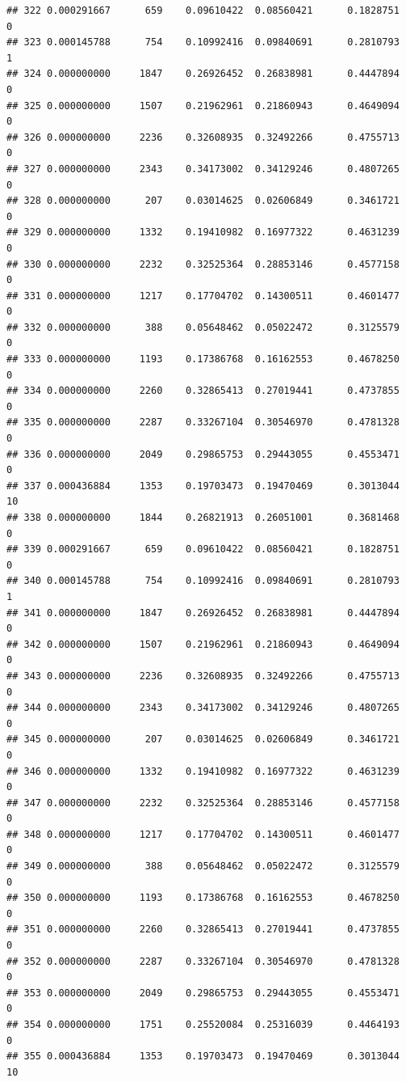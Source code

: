 \documentclass[
]{article}
\begin{document}
\begin{verbatim}
## 322 0.000291667      659    0.09610422  0.08560421      0.1828751       0
## 323 0.000145788      754    0.10992416  0.09840691      0.2810793       1
## 324 0.000000000     1847    0.26926452  0.26838981      0.4447894       0
## 325 0.000000000     1507    0.21962961  0.21860943      0.4649094       0
## 326 0.000000000     2236    0.32608935  0.32492266      0.4755713       0
## 327 0.000000000     2343    0.34173002  0.34129246      0.4807265       0
## 328 0.000000000      207    0.03014625  0.02606849      0.3461721       0
## 329 0.000000000     1332    0.19410982  0.16977322      0.4631239       0
## 330 0.000000000     2232    0.32525364  0.28853146      0.4577158       0
## 331 0.000000000     1217    0.17704702  0.14300511      0.4601477       0
## 332 0.000000000      388    0.05648462  0.05022472      0.3125579       0
## 333 0.000000000     1193    0.17386768  0.16162553      0.4678250       0
## 334 0.000000000     2260    0.32865413  0.27019441      0.4737855       0
## 335 0.000000000     2287    0.33267104  0.30546970      0.4781328       0
## 336 0.000000000     2049    0.29865753  0.29443055      0.4553471       0
## 337 0.000436884     1353    0.19703473  0.19470469      0.3013044      10
## 338 0.000000000     1844    0.26821913  0.26051001      0.3681468       0
## 339 0.000291667      659    0.09610422  0.08560421      0.1828751       0
## 340 0.000145788      754    0.10992416  0.09840691      0.2810793       1
## 341 0.000000000     1847    0.26926452  0.26838981      0.4447894       0
## 342 0.000000000     1507    0.21962961  0.21860943      0.4649094       0
## 343 0.000000000     2236    0.32608935  0.32492266      0.4755713       0
## 344 0.000000000     2343    0.34173002  0.34129246      0.4807265       0
## 345 0.000000000      207    0.03014625  0.02606849      0.3461721       0
## 346 0.000000000     1332    0.19410982  0.16977322      0.4631239       0
## 347 0.000000000     2232    0.32525364  0.28853146      0.4577158       0
## 348 0.000000000     1217    0.17704702  0.14300511      0.4601477       0
## 349 0.000000000      388    0.05648462  0.05022472      0.3125579       0
## 350 0.000000000     1193    0.17386768  0.16162553      0.4678250       0
## 351 0.000000000     2260    0.32865413  0.27019441      0.4737855       0
## 352 0.000000000     2287    0.33267104  0.30546970      0.4781328       0
## 353 0.000000000     2049    0.29865753  0.29443055      0.4553471       0
## 354 0.000000000     1751    0.25520084  0.25316039      0.4464193       0
## 355 0.000436884     1353    0.19703473  0.19470469      0.3013044      10

\end{verbatim}
\end{document}
